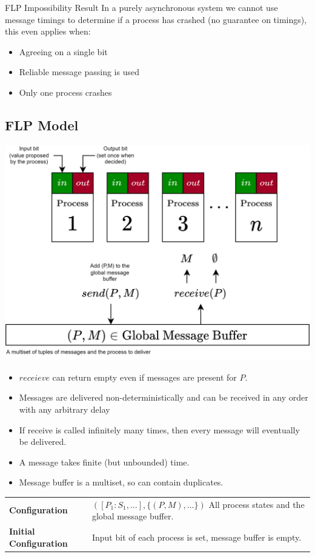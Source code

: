 \begin{definitionbox}{FLP Impossibility Result}
    In a purely asynchronous system we cannot use message timings to determine if a process has crashed (no guarantee on timings), this even applies when:
    \begin{itemize}
        \item Agreeing on a single bit
        \item Reliable message passing is used
        \item Only one process crashes
    \end{itemize}
\end{definitionbox}

\subsection{FLP Model}
\begin{center}
    \includegraphics[width=.8\textwidth]{consensus/images/flp_model.drawio.png}
\end{center}
\begin{itemize}
    \item $receieve$ can return empty even if messages are present for $P$.
    \item Messages are delivered non-deterministically and can be received in any order with any arbitrary delay
    \item If receive is called infinitely many times, then every message will eventually be delivered. 
    \item A message takes finite (but unbounded) time.
    \item Message buffer is a multiset, so can contain duplicates.
\end{itemize}
\begin{center}
    \begin{tabular}{l p{}}
        \textbf{Configuration} & $([P_1 : S_1, \dots], \{(P, M), \dots\})$ All process states and the global message buffer. \\
        \textbf{Initial Configuration} & Input bit of each process is set, message buffer is empty. \\
    \end{tabular}
\end{center}
